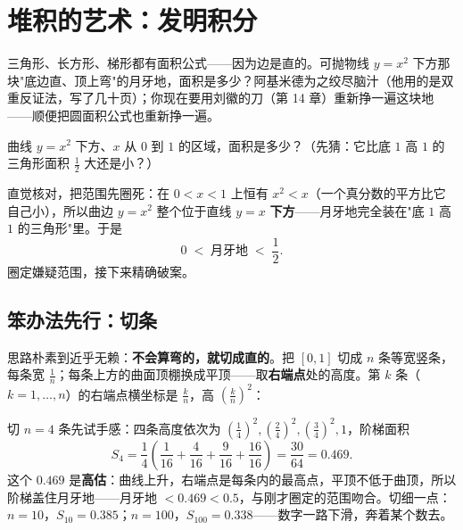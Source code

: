 \chapter{堆积的艺术：发明积分}

三角形、长方形、梯形都有面积公式——因为边是直的。可抛物线 $y = x^2$ 下方那块"底边直、顶上弯"的月牙地，面积是多少？阿基米德为之绞尽脑汁（他用的是双重反证法，写了几十页）；你现在要用刘徽的刀（第 14 章）重新挣一遍这块地——顺便把圆面积公式也重新挣一遍。

\begin{kaiwei}
曲线 $y = x^2$ 下方、$x$ 从 $0$ 到 $1$ 的区域，面积是多少？（先猜：它比底 $1$ 高 $1$ 的三角形面积 $\tfrac12$ 大还是小？）
\end{kaiwei}

直觉核对，把范围先圈死：在 $0 < x < 1$ 上恒有 $x^2 < x$（一个真分数的平方比它自己小），所以曲边 $y = x^2$ 整个位于直线 $y = x$ \textbf{下方}——月牙地完全装在"底 $1$ 高 $1$ 的三角形"里。于是
\[
0 \;<\; \text{月牙地} \;<\; \frac12 .
\]
圈定嫌疑范围，接下来精确破案。

\section{笨办法先行：切条}

思路朴素到近乎无赖：\textbf{不会算弯的，就切成直的}。把 $[0,1]$ 切成 $n$ 条等宽竖条，每条宽 $\tfrac1n$；每条上方的曲面顶棚换成平顶——取\textbf{右端点}处的高度。第 $k$ 条（$k = 1, \dots, n$）的右端点横坐标是 $\tfrac kn$，高 $\left(\tfrac kn\right)^2$：


切 $n = 4$ 条先试手感：四条高度依次为 $\left(\tfrac14\right)^2, \left(\tfrac24\right)^2, \left(\tfrac34\right)^2, 1$，阶梯面积
\[
S_4 = \frac14\left(\frac{1}{16} + \frac{4}{16} + \frac{9}{16} + \frac{16}{16}\right) = \frac{30}{64} = 0.469 .
\]
这个 $0.469$ 是\textbf{高估}：曲线上升，右端点是每条内的最高点，平顶不低于曲顶，所以阶梯盖住月牙地——月牙地 $< 0.469 < 0.5$，与刚才圈定的范围吻合。切细一点：$n = 10$，$S_{10} = 0.385$；$n = 100$，$S_{100} = 0.338$——数字一路下滑，奔着某个数去。

